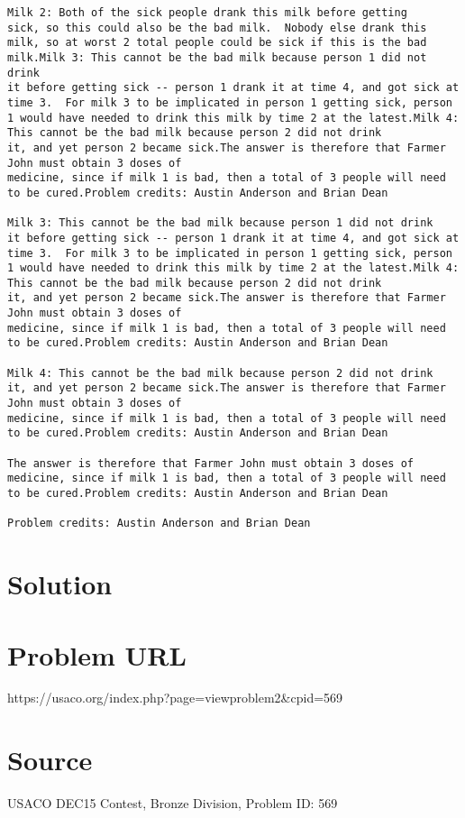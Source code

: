 \documentclass[12pt]{article}
\begin{document}
\begin{verbatim}
Milk 2: Both of the sick people drank this milk before getting
sick, so this could also be the bad milk.  Nobody else drank this
milk, so at worst 2 total people could be sick if this is the bad
milk.Milk 3: This cannot be the bad milk because person 1 did not drink
it before getting sick -- person 1 drank it at time 4, and got sick at
time 3.  For milk 3 to be implicated in person 1 getting sick, person
1 would have needed to drink this milk by time 2 at the latest.Milk 4: This cannot be the bad milk because person 2 did not drink
it, and yet person 2 became sick.The answer is therefore that Farmer John must obtain 3 doses of
medicine, since if milk 1 is bad, then a total of 3 people will need
to be cured.Problem credits: Austin Anderson and Brian Dean

Milk 3: This cannot be the bad milk because person 1 did not drink
it before getting sick -- person 1 drank it at time 4, and got sick at
time 3.  For milk 3 to be implicated in person 1 getting sick, person
1 would have needed to drink this milk by time 2 at the latest.Milk 4: This cannot be the bad milk because person 2 did not drink
it, and yet person 2 became sick.The answer is therefore that Farmer John must obtain 3 doses of
medicine, since if milk 1 is bad, then a total of 3 people will need
to be cured.Problem credits: Austin Anderson and Brian Dean

Milk 4: This cannot be the bad milk because person 2 did not drink
it, and yet person 2 became sick.The answer is therefore that Farmer John must obtain 3 doses of
medicine, since if milk 1 is bad, then a total of 3 people will need
to be cured.Problem credits: Austin Anderson and Brian Dean

The answer is therefore that Farmer John must obtain 3 doses of
medicine, since if milk 1 is bad, then a total of 3 people will need
to be cured.Problem credits: Austin Anderson and Brian Dean

Problem credits: Austin Anderson and Brian Dean
\end{verbatim}

\section*{Solution}


\section*{Problem URL}
https://usaco.org/index.php?page=viewproblem2&cpid=569

\section*{Source}
USACO DEC15 Contest, Bronze Division, Problem ID: 569
\end{document}
